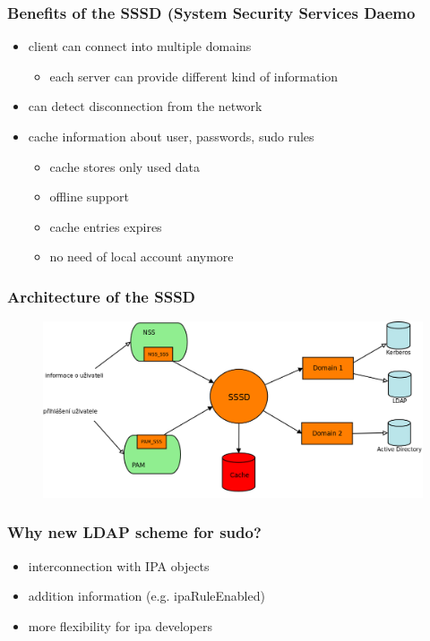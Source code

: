 \documentclass[pdftex,unicode,xcolor=table]{beamer}
\begin{document}
 {
    \begin{rhbg}
    \begin{frame}
    \vspace
    {}
    {\color{white}{\hfill Thank you for listening.\hfill}}
    \end{frame}
    \end{rhbg}
}

\begin{frame}[fragile]
    \frametitle{Benefits of the SSSD (System Security Services Daemo}
    \begin{itemize}
        \item client can connect into multiple domains
        \begin{itemize}
            \item each server can provide different kind of information
        \end{itemize}
        \item can detect disconnection from the network
        \item cache information about user, passwords, sudo rules
        \begin{itemize}
            \item cache stores only used data
            \item offline support
            \item cache entries expires
            \item no need of local account anymore
        \end{itemize}
    \end{itemize}
\end{frame}


\begin{frame}[fragile]
    \frametitle{Architecture of the SSSD}
    \begin{figure}
        \includegraphics[scale=0.20]{img/sssd-architecture.png}
    \end{figure}
\end{frame}

\begin{frame}[fragile]
    \frametitle{Why new LDAP scheme for sudo?}
    \begin{itemize}
        \item interconnection with IPA objects
        \item addition information (e.g. ipaRuleEnabled)
        \item more flexibility for ipa developers
    \end{itemize}
\end{frame}
\end{document}
